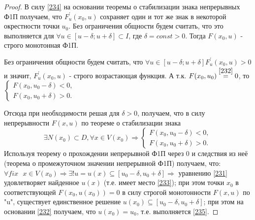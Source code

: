 \begin{proof}
    В силу \eqref{234} на основании теоремы о стабилизации знака непрерывных Ф1П получаем, что $F_u^{'} (x_0,u)$ сохраняет один и тот же знак в некоторой окрестности точки $u_0$. Без ограничения общности будем считать, что это выполняется для $\forall u \in [u - \delta; u + \delta] \subset I$, где $\delta = const > 0$. Тогда $F(x_0, u)$ - строго монотонная Ф1П.
    
    Без ограничения общности будем считать, что $\forall u \in [u - \delta; u + \delta] F_u^{'} (x_0,u) > 0$ и значит, $F_u^{'} (x_0,u)$ - строго возрастающая функция. А т.к. $F(x_0, u_0) \overset{\eqref{232}}{=} 0$, то $\begin{cases} F(x_0, u_0 - \delta) < 0, \\ F(x_0, u_0 + \delta) > 0. \end{cases}$
    
    Отсюда при необходимости решая для $\delta > 0$, получаем, что в силу непрерывности $F(x,u)$ по теореме о стабилизации знака
    \begin{equation*}
    \exists N (x_0) \subset D, \forall x \in V(x_0) \Rightarrow \begin{cases} F(x_0, u_0 - \delta) < 0, \\ F(x_0, u_0 + \delta) > 0. \end{cases}
    \end{equation*}
    Используя теорему о прохождении непрерывной Ф1П через 0 и следствия из неё (теорема о промежуточном значении непрерывной Ф1П) получаем, что:
    $\forall fix \text{ } x \in V(x_0) \Rightarrow \exists ! u = u(x) \subseteq [u_0 - \delta, u_0 + \delta] \Rightarrow$ уравнению \eqref{231} удовлетворяет найденное $u(x)$ (т.е. имеет место \eqref{233}); при этом точки $x_0$ в соответствующей $F(x_0, u(x_0))  = 0$ в силу строгой монотонности $F(x,u)$ по "u", существует единственное решение $u(x_0) \subseteq [u_0 - \delta, u_0 + \delta]$; при этом на основании \eqref{232} получаем, что $u(x_0) = u_0$, т.е. выполняется \eqref{235}.
\end{proof}

